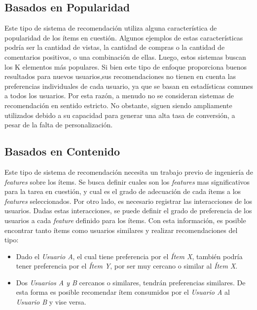 \documentclass[11pt,a4paper,twoside]{thesis}
\begin{document}
\subsection{Basados en Popularidad}

Este tipo de sistema de recomendación utiliza alguna característica de
popularidad de los ítems en cuestión. Algunos ejemplos de estas características
podría ser la cantidad de vistas, la cantidad de compras o la cantidad de
comentarios positivos, o una combinación de ellas. Luego, estos sistemas buscan
los K elementos más populares. Si bien este tipo de enfoque proporciona buenos
resultados para nuevos usuarios,sus recomendaciones no tienen en cuenta las
preferencias individuales de cada usuario, ya que se basan en estadísticas
comunes a todos los usuarios. Por esta razón, a menudo no se consideran
sistemas de recomendación en sentido estricto. No obstante, siguen siendo
ampliamente utilizados debido a su capacidad para generar una alta tasa de
conversión, a pesar de la falta de personalización.

\subsection{Basados en Contenido}

Este tipo de sistema de recomendación necesita un trabajo previo de ingeniería
de \textit{features} sobre los ítems. Se busca definir cuales son los
\textit{features} mas significativos para la tarea en cuestión, y cual es el
grado de adecuación de cada ítems a los \textit{features} seleccionados. Por
otro lado, es necesario registrar las interacciones de los usuarios. Dadas
estas interacciones, se puede definir el grado de preferencia de los usuarios a
cada \textit{feature} definido para los ítems. Con esta información, es posible
encontrar tanto ítems como usuarios similares y realizar recomendaciones del
tipo:

\begin{itemize}
	\item Dado el \textit{Usuario A}, el cual tiene preferencia por el \textit{Ítem X},
	      también podría tener preferencia por el \textit{Ítem Y}, por ser muy cercano o
	      similar al \textit{Ítem X}.
	\item Dos \textit{Usuarios A y B} cercanos o similares, tendrán preferencias
	      similares. De esta forma es posible recomendar ítem consumidos por el
	      \textit{Usuario A} al \textit{Usuario B} y vise versa.
\end{itemize}
\end{document}
